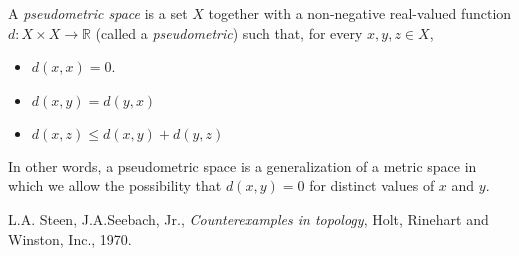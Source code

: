\documentclass[12pt]{article}
\newcommand{\<}{\langle}
\renewcommand{\>}{\rangle}
\begin{document}
A {\em pseudometric space} is a set $X$ together with a non-negative real-valued function $d: X \times X \longrightarrow \mathbb{R}$ (called a {\em pseudometric}) such that, for every $x,y,z \in X$,
\begin{itemize}
\item $d(x,x) = 0$.
\item $d(x,y) = d(y,x)$
\item $d(x,z) \leq d(x,y) + d(y,z)$
\end{itemize}

In other words, a pseudometric space is a generalization of a metric space in which we allow the possibility that $d(x,y)=0$ for distinct values of $x$ and $y$.

\begin{thebibliography}{9}
 L.A. Steen, J.A.Seebach, Jr.,
\emph{Counterexamples in topology},
Holt, Rinehart and Winston, Inc., 1970.
\end{thebibliography}
\end{document}
